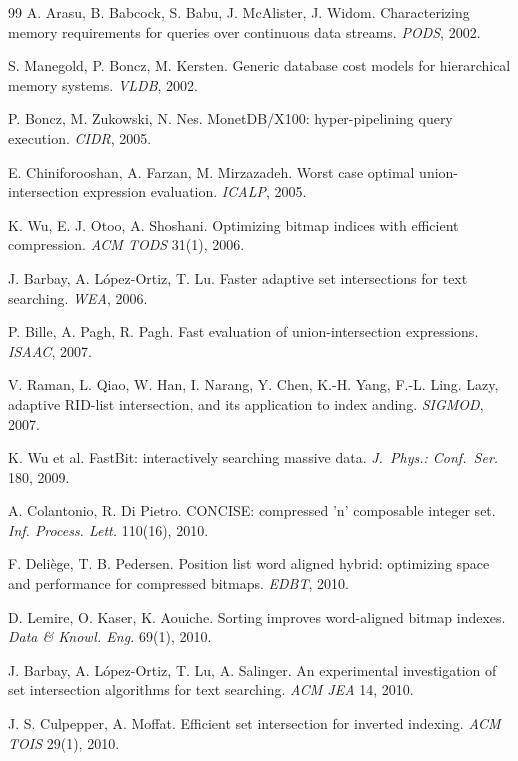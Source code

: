 \documentclass[sigconf,nonacm]{acmart}
\begin{document}
\begin{thebibliography}{99}
 A. Arasu, B. Babcock, S. Babu, J. McAlister,
J. Widom. Characterizing memory requirements for queries over
continuous data streams. \emph{PODS}, 2002.

 S. Manegold, P. Boncz, M. Kersten. Generic
database cost models for hierarchical memory systems. \emph{VLDB}, 2002.

 P. Boncz, M. Zukowski, N. Nes. MonetDB/X100:
hyper-pipelining query execution. \emph{CIDR}, 2005.

 E. Chiniforooshan, A. Farzan,
M. Mirzazadeh. Worst case optimal union-intersection expression
evaluation. \emph{ICALP}, 2005.

 K. Wu, E. J. Otoo, A. Shoshani. Optimizing bitmap
indices with efficient compression. \emph{ACM TODS} 31(1), 2006.

 J. Barbay, A. L\'opez-Ortiz, T. Lu. Faster adaptive
set intersections for text searching. \emph{WEA}, 2006.

 P. Bille, A. Pagh, R. Pagh. Fast evaluation of
union-intersection expressions. \emph{ISAAC}, 2007.

 V. Raman, L. Qiao, W. Han, I. Narang, Y. Chen,
K.-H. Yang, F.-L. Ling. Lazy, adaptive RID-list intersection, and its
application to index anding. \emph{SIGMOD}, 2007.

 K. Wu et al. FastBit: interactively searching massive
data. \emph{J.\ Phys.: Conf.\ Ser.} 180, 2009.

 A. Colantonio, R. Di Pietro. CONCISE:
compressed 'n' composable integer set. \emph{Inf. Process. Lett.}
110(16), 2010.

 F. Deli\`ege, T. B. Pedersen. Position list word
aligned hybrid: optimizing space and performance for compressed
bitmaps. \emph{EDBT}, 2010.

 D. Lemire, O. Kaser, K. Aouiche. Sorting
improves word-aligned bitmap indexes. \emph{Data \& Knowl. Eng.} 69(1),
2010.

 J. Barbay, A. L\'opez-Ortiz, T. Lu, A. Salinger.
An experimental investigation of set intersection algorithms for text
searching. \emph{ACM JEA} 14, 2010.

 J. S. Culpepper, A. Moffat. Efficient set
intersection for inverted indexing. \emph{ACM TOIS} 29(1), 2010.


\end{thebibliography}
\end{document}

